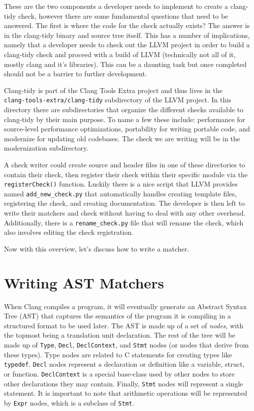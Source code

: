 These are the two components a developer needs to implement to create a clang-tidy check, however there are some fundamental questions that need to be answered. The first is where the code for the check actually exists? The answer is in the clang-tidy binary and source tree itself. This has a number of implications, namely that a developer needs to check out the LLVM project in order to build a clang-tidy check and proceed with a build of LLVM (technically not all of it, mostly clang and it's libraries). This can be a daunting task but once completed should not be a barrier to further development. 

Clang-tidy is part of the Clang Tools Extra project and thus lives in the \\ \texttt{clang-tools-extra/clang-tidy} subdirectory of the LLVM project. In this directory there are subdirectories that organize the different checks available to clang-tidy by their main purpose. To name a few these include: performance for source-level performance optimizations, portability for writing portable code, and modernize for updating old codebases. The check we are writing will be in the modernization subdirectory.

A check writer could create source and header files in one of these directories to contain their check, then register their check within their specific module via the \texttt{registerCheck()} function. Luckily there is a nice script that LLVM provides named \texttt{add\_new\_check.py} that automatically handles creating template files, registering the check, and creating documentation. The developer is then left to write their matchers and check without having to deal with any other overhead. Additionally, there is a \texttt{rename\_check.py} file that will rename the check, which also involves editing the check registration.

Now with this overview, let's discuss how to write a matcher.

\section{Writing AST Matchers}

When Clang compiles a program, it will eventually generate an Abstract Syntax Tree (AST) that captures the semantics of the program it is compiling in a structured format to be used later. The AST is made up of a set of \textit{nodes}, with the topmost being a translation unit declaration. The rest of the tree will be made up of \texttt{Type}, \texttt{Decl}, \texttt{DeclContext}, and \texttt{Stmt} nodes (or nodes that derive from these types). Type nodes are related to C statements for creating types like \texttt{typedef}. \texttt{Decl} nodes represent a declaration or definition like a variable, struct, or function. \texttt{DeclContext} is a special base-class used by other nodes to store other declarations they may contain. Finally, \texttt{Stmt} nodes will represent a single statement. It is important to note that arithmetic operations will be represented by \texttt{Expr} nodes, which is a subclass of \texttt{Stmt}.

